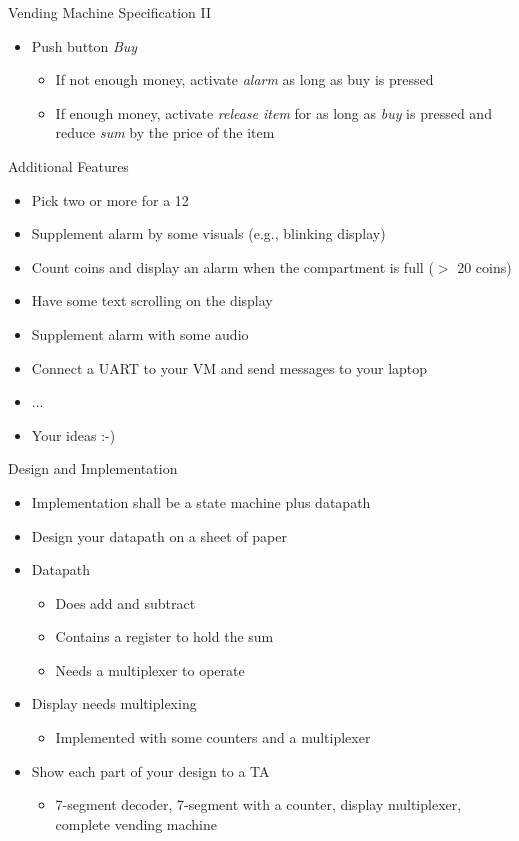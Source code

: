 \begin{frame}[fragile]{Vending Machine Specification II}
\begin{itemize}
\item Push button \emph{Buy}
\begin{itemize}
\item If not enough money, activate \emph{alarm} as long as buy is pressed
\item If enough money, activate \emph{release item} for as long as \emph{buy}
is pressed and reduce \emph{sum} by the price of the item
\end{itemize}
\end{itemize}
\end{frame}

\begin{frame}[fragile]{Additional Features}
\begin{itemize}
\item Pick two or more for a 12
\item Supplement alarm by some visuals (e.g., blinking display)
\item Count coins and display an alarm when the compartment is full ($>$ 20 coins)
\item Have some text scrolling on the display
\item Supplement alarm with some audio
\item Connect a UART to your VM and send messages to your laptop
\item ...
\item Your ideas :-)
\end{itemize}
\end{frame}

\begin{frame}[fragile]{Design and Implementation}
\begin{itemize}
\item Implementation shall be a state machine plus datapath
\item Design your datapath on a sheet of paper
\item Datapath
\begin{itemize}
\item Does add and subtract
\item Contains a register to hold the sum
\item Needs a multiplexer to operate
\end{itemize}
\item Display needs multiplexing
\begin{itemize}
\item Implemented with some counters and a multiplexer
\end{itemize}
\item Show each part of your design to a TA
\begin{itemize}
\item 7-segment decoder, 7-segment with a counter, display multiplexer, complete vending machine
\end{itemize}
\end{itemize}
\end{frame}

